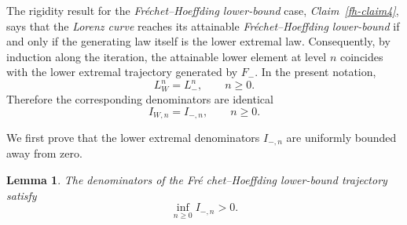 \documentclass[onecolumn]{article}
\newtheorem{lemma}[theorem]{Lemma}
\begin{document}
The rigidity result for the \textit{Fr\'{e}chet--Hoeffding lower-bound}
case, \textit{Claim~\ref{fh-claim4}}, says that the \textit{Lorenz curve}
reaches its attainable \textit{Fr\'{e}chet--Hoeffding lower-bound} if and
only if the generating law itself is the lower extremal law. Consequently,
by induction along the iteration, the attainable lower element at level $n$
coincides with the lower extremal trajectory generated by $F_{-}$. In the
present notation, 
\begin{equation}
L_{W}^{n}=L_{-}^{n},\qquad n\geq 0.  \label{345a25}
\end{equation}%
Therefore the corresponding denominators are identical 
\begin{equation}
I_{W,n}=I_{-,n},\qquad n\geq 0.  \label{345a26}
\end{equation}

We first prove that the lower extremal denominators $I_{-,n}$ are uniformly
bounded away from zero.

\begin{lemma}
\noindent \textbf{\label{lbound}} The denominators of the \textit{Fr\'{e}%
chet--Hoeffding lower-bound} trajectory satisfy 
\begin{equation}
\inf_{n\geq 0}I_{-,n}>0.  \label{345a1}
\end{equation}%
\medskip
\end{lemma}
\end{document}
